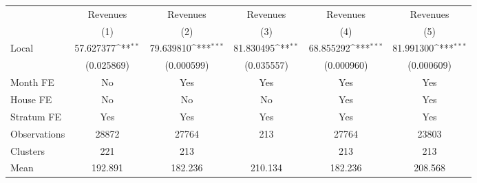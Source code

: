 {
\def\sym#1{\ifmmode^{#1}\else\(^{#1}\)\fi}
\begin{tabular}{l*{5}{c}}
\toprule
                &\multicolumn{1}{c}{Revenues}&\multicolumn{1}{c}{Revenues}&\multicolumn{1}{c}{Revenues}&\multicolumn{1}{c}{Revenues}&\multicolumn{1}{c}{Revenues}\\
                &\multicolumn{1}{c}{(1)}         &\multicolumn{1}{c}{(2)}         &\multicolumn{1}{c}{(3)}         &\multicolumn{1}{c}{(4)}         &\multicolumn{1}{c}{(5)}         \\
\midrule
Local           &57.627377\sym{**} &79.639810\sym{***}&81.830495\sym{**} &68.855292\sym{***}&81.991300\sym{***}\\
                &(0.025869)         &(0.000599)         &(0.035557)         &(0.000960)         &(0.000609)         \\
Month FE        &       No         &      Yes         &      Yes         &      Yes         &      Yes         \\
House FE        &       No         &       No         &       No         &      Yes         &      Yes         \\
Stratum FE      &      Yes         &      Yes         &      Yes         &      Yes         &      Yes         \\
\midrule
Observations    &    28872         &    27764         &      213         &    27764         &    23803         \\
Clusters        &      221         &      213         &                  &      213         &      213         \\
Mean            &  192.891         &  182.236         &  210.134         &  182.236         &  208.568         \\
\bottomrule
\end{tabular}
}
